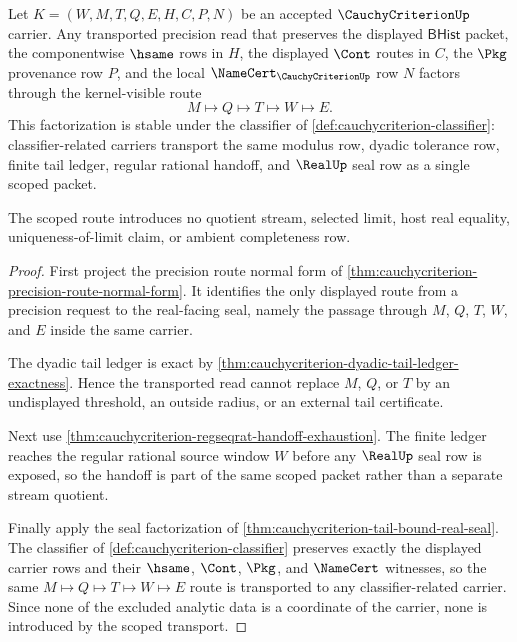 \begin{theorem}
\label{thm:cauchycriterion-scoped-tail-seal-transport}
Let $K=(W,M,T,Q,E,H,C,P,N)$ be an accepted $\CauchyCriterionUp$ carrier. Any transported precision read that preserves the displayed $\mathsf{BHist}$ packet, the componentwise $\hsame$ rows in $H$, the displayed $\Cont$ routes in $C$, the $\Pkg$ provenance row $P$, and the local $\NameCert_{\CauchyCriterionUp}$ row $N$ factors through the kernel-visible route
$$
M \longmapsto Q \longmapsto T \longmapsto W \longmapsto E.
$$
This factorization is stable under the classifier of \autoref{def:cauchycriterion-classifier}: classifier-related carriers transport the same modulus row, dyadic tolerance row, finite tail ledger, regular rational handoff, and $\RealUp$ seal row as a single scoped packet.

The scoped route introduces no quotient stream, selected limit, host real equality, uniqueness-of-limit claim, or ambient completeness row.
\end{theorem}
\begin{proof}
First project the precision route normal form of \autoref{thm:cauchycriterion-precision-route-normal-form}. It identifies the only displayed route from a precision request to the real-facing seal, namely the passage through $M$, $Q$, $T$, $W$, and $E$ inside the same carrier.

The dyadic tail ledger is exact by \autoref{thm:cauchycriterion-dyadic-tail-ledger-exactness}. Hence the transported read cannot replace $M$, $Q$, or $T$ by an undisplayed threshold, an outside radius, or an external tail certificate.

Next use \autoref{thm:cauchycriterion-regseqrat-handoff-exhaustion}. The finite ledger reaches the regular rational source window $W$ before any $\RealUp$ seal row is exposed, so the handoff is part of the same scoped packet rather than a separate stream quotient.

Finally apply the seal factorization of \autoref{thm:cauchycriterion-tail-bound-real-seal}. The classifier of \autoref{def:cauchycriterion-classifier} preserves exactly the displayed carrier rows and their $\hsame$, $\Cont$, $\Pkg$, and $\NameCert$ witnesses, so the same $M \longmapsto Q \longmapsto T \longmapsto W \longmapsto E$ route is transported to any classifier-related carrier. Since none of the excluded analytic data is a coordinate of the carrier, none is introduced by the scoped transport.
\end{proof}

